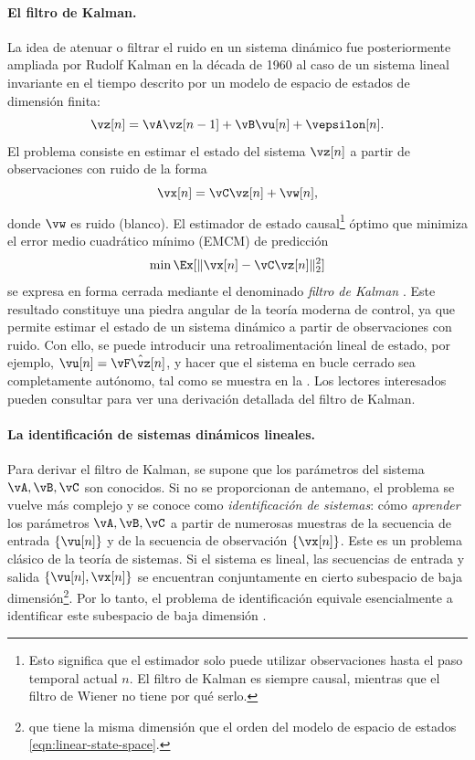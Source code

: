 \documentclass[../../book-main_es.tex]{subfiles}
\begin{document}
\paragraph{El filtro de Kalman.}
La idea de atenuar o filtrar el ruido en un sistema dinámico fue posteriormente
ampliada por Rudolf Kalman en la década de 1960 al caso de un sistema lineal 
invariante en el tiempo descrito por un modelo de espacio de estados de dimensión 
finita:
\begin{equation}
    \vz[n] = \vA \vz[n-1] + \vB\vu[n] + \vepsilon[n].
    \label{eqn:linear-state-space}
\end{equation}
El problema consiste en estimar el estado del sistema \(\vz[n]\) a partir 
de observaciones con ruido de la forma
\begin{equation}
    \vx[n] = \vC \vz[n] + \vw[n],
    \label{eqn:Kalman-model}
\end{equation}
donde \(\vw\) es ruido (blanco). El estimador de estado causal\footnote{Esto
    significa que el estimador solo puede utilizar observaciones hasta el paso temporal actual
    \(n\). El filtro de Kalman es siempre causal, mientras que el filtro de Wiener
no tiene por qué serlo.} óptimo que minimiza el error medio cuadrático mínimo (EMCM) de predicción
\begin{equation}
    \min \Ex[ \|\vx[n] - \vC\vz[n]\|_{2}^{2}]
    \label{eqn:kalman-mse}
\end{equation}
se expresa en forma cerrada mediante el denominado \textit{filtro de Kalman}
\cite{kalman1960new}. Este resultado constituye una piedra angular de la teoría 
moderna de control, ya que permite estimar el estado de un sistema dinámico a 
partir de observaciones con ruido. Con ello, se puede introducir una 
retroalimentación lineal de estado, por ejemplo, \(\vu[n] = \vF \hat{\vz}[n]\), 
y hacer que el sistema en bucle cerrado sea completamente autónomo, tal como se 
muestra en la . Los lectores interesados pueden consultar
\cite[Apéndice B]{MaY2003} para ver una derivación detallada del filtro de Kalman.

\paragraph{La identificación de sistemas dinámicos lineales.}
Para derivar el filtro de Kalman, se supone que los parámetros del sistema 
\(\vA, \vB, \vC\) son conocidos. Si no se proporcionan de antemano, el
problema se vuelve más complejo y se conoce como \textit{identificación
de sistemas}: cómo \textit{aprender} los parámetros \(\vA, \vB,
\vC\) a partir de numerosas muestras de la secuencia de entrada \(\{\vu[n]\}\) y
de la secuencia de observación \(\{\vx[n]\}\). Este es un problema clásico de
la teoría de sistemas. Si el sistema es lineal, las secuencias de entrada y salida
\(\{\vu[n], \vx[n]\}\) se encuentran conjuntamente en cierto
subespacio de baja dimensión\footnote{que tiene la misma dimensión que el
orden del modelo de espacio de estados \eqref{eqn:linear-state-space}.}.
Por lo tanto, el problema de identificación equivale esencialmente a
identificar este subespacio de baja dimensión
\cite{OverscheeP1996,Liu-2009-CDC,Liu-2010-SIAM}.
\end{document}
